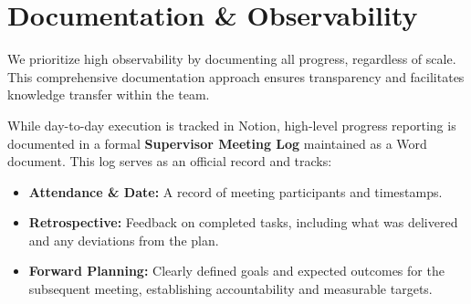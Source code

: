 \section{Documentation \& Observability}
We prioritize high observability by documenting all progress, regardless of scale. This comprehensive documentation approach ensures transparency and facilitates knowledge transfer within the team.

While day-to-day execution is tracked in Notion, high-level progress reporting is documented in a formal \textbf{Supervisor Meeting Log} maintained as a Word document. This log serves as an official record and tracks:
\begin{itemize}
    \item \textbf{Attendance \& Date:} A record of meeting participants and timestamps.
    \item \textbf{Retrospective:} Feedback on completed tasks, including what was delivered and any deviations from the plan.
    \item \textbf{Forward Planning:} Clearly defined goals and expected outcomes for the subsequent meeting, establishing accountability and measurable targets.
\end{itemize}
